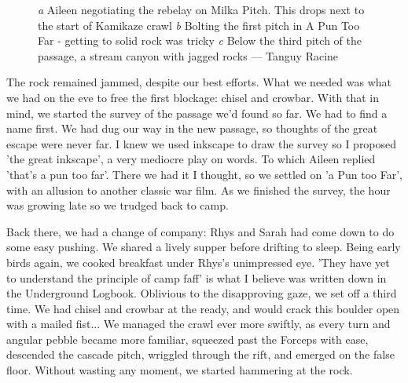 \begin{figure}[t!]
\checkoddpage \ifoddpage \forcerectofloat \else \forceversofloat \fi
\centering
    \begin{subfigure}[t]{0.316\textwidth}
        \centering
        \caption{} \label{Bolting a Pun Too Far}
    \end{subfigure}
\hfill    
\begin{subfigure}[t]{0.674\textwidth}
    \centering
        \caption{} \label{Canyon of A Pun Too Far}
    \end{subfigure}
    \begin{subfigure}[t]{\textwidth}
\centering
{}
 \caption{}\label{milka pitch}
\end{subfigure}
    \caption{
    \emph{a} Aileen negotiating the rebelay on Milka Pitch. This drops next to the start of Kamikaze crawl
    \emph{b} Bolting the first pitch in A Pun Too Far - getting to solid rock was tricky
    \emph{c} Below the third pitch of the passage, a stream canyon with jagged rocks --- Tanguy Racine }
\end{figure}

The rock remained jammed, despite our best efforts. What we needed was what we had on the eve to free the first blockage: chisel and crowbar. With that in mind, we started the survey of the passage we'd found so far. We had to find a name first. We had dug our way in the new passage, so thoughts of the great escape were never far. I knew we used inkscape to draw the survey so I proposed 'the great inkscape', a very mediocre play on words. To which Aileen replied 'that's a pun too far'. There we had it I thought, so we settled on 'a Pun too Far', with an allusion to another classic war film. As we finished the survey, the hour was growing late so we trudged back to camp.

Back there, we had a change of company: Rhys and Sarah had come down to do some easy pushing. We shared a lively supper before drifting to sleep.
Being early birds again, we cooked breakfast under Rhys's unimpressed eye. 'They have yet to understand the principle of camp faff' is what I believe was written down in the Underground Logbook. Oblivious to the disapproving gaze, we set off a third time. We had chisel and crowbar at the ready, and would crack this boulder open with a mailed fist...
We managed the crawl ever more swiftly, as every turn and angular pebble became more familiar, squeezed past the Forceps with ease, descended the cascade pitch, wriggled through the rift, and emerged on the false floor. Without wasting any moment, we started hammering at the rock. 

